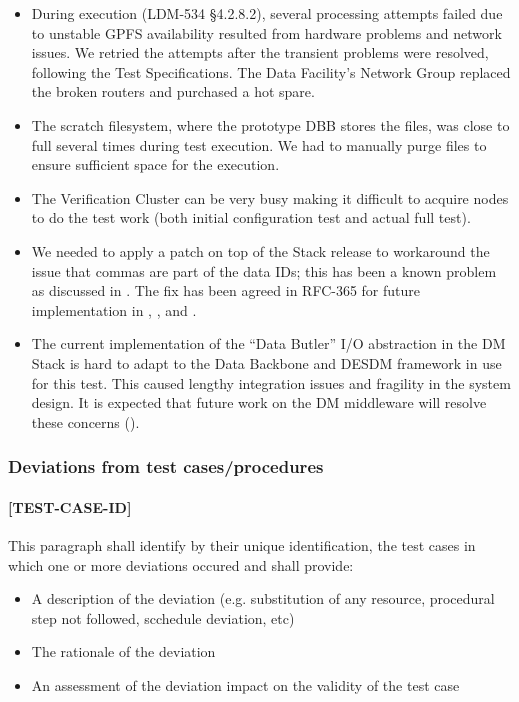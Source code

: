\documentclass[DM,lsstdraft,STR,toc]{lsstdoc}
\begin{document}
\begin{itemize}

  \item{
    During execution (LDM-534 \S 4.2.8.2), several processing attempts failed due to unstable GPFS availability resulted from hardware problems and network issues.
    We retried the attempts after the transient problems were resolved, following the Test Specifications.
    The Data Facility's Network Group replaced the broken routers and purchased a hot spare.
  }

  \item{
    The scratch filesystem, where the prototype DBB stores the files, was close to full several times during test execution.
	We had to manually purge files to ensure sufficient space for the execution.
  }

  \item{
    The Verification Cluster can be very busy making it difficult to acquire nodes to do the test work (both initial configuration test and actual full test).
  }

  \item{
    We needed to apply a patch on top of the Stack release to workaround the issue that commas are part of the data IDs; this has been a known problem as discussed in .
	The fix has been agreed in RFC-365 for future implementation in , , and .
  }

  \item{
    The current implementation of the ``Data Butler'' I/O abstraction in the DM Stack is hard to adapt to the Data Backbone and DESDM framework in use for this test.
    This caused lengthy integration issues and fragility in the system design.
    It is expected that future work on the DM middleware will resolve these concerns ().
  }
\end{itemize}

\subsubsection{Deviations from test cases/procedures}
\paragraph{[TEST-CASE-ID]}
This paragraph shall identify by their unique identification, the test cases in which one or more deviations occured and shall provide:
\begin{itemize}
\item A description of the deviation (e.g. substitution of any resource, procedural step not followed, scchedule deviation, etc)
\item The rationale of the deviation
\item An assessment of the deviation impact on the validity of the test case
\end{itemize}
\end{document}
